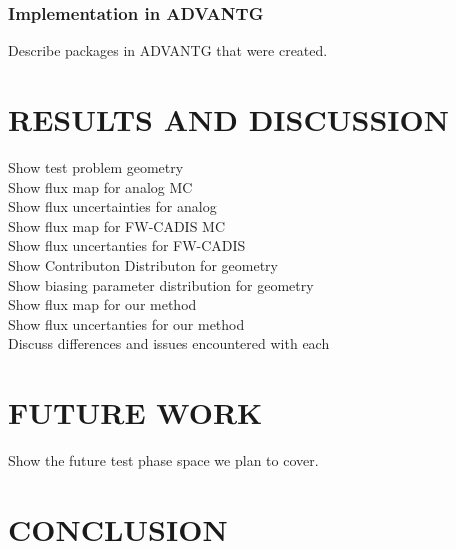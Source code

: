 \documentclass[12pt]{article}
\begin{document}
%
\subsubsection{Implementation in ADVANTG} 
\label{subsubsect::minor}

Describe packages in ADVANTG that were created. 


%
\section{RESULTS AND DISCUSSION} 
\label{sect::references}

Show test problem geometry
\\ Show flux map for analog MC
\\ Show flux uncertainties for analog
\\ Show flux map for FW-CADIS MC
\\ Show flux uncertanties for FW-CADIS
\\ Show Contributon Distributon for geometry
\\ Show biasing parameter distribution for geometry
\\ Show flux map for our method
\\ Show flux uncertanties for our method
\\ Discuss differences and issues encountered with each

%
\section{FUTURE WORK} 
\label{sect::references}

Show the future test phase space we plan to cover. 


%
\section{CONCLUSION} 
\label{sect::conclusion}
\end{document}
